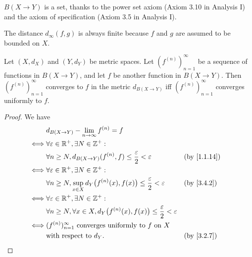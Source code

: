 \begin{note}
  \(B(X \to Y)\) is a set, thanks to the power set axiom (Axiom 3.10 in Analysis I) and the axiom of specification (Axiom 3.5 in Analysis I).
\end{note}

\begin{note}
  The distance \(d_\infty(f, g)\) is always finite because \(f\) and \(g\) are assumed to be bounded on \(X\).
\end{note}

\setcounter{thm}{3}
\begin{prop}\label{3.4.4}
  Let \((X, d_X)\) and \((Y, d_Y)\) be metric spaces.
  Let \((f^{(n)})_{n = 1}^\infty\) be a sequence of functions in \(B(X \to Y)\), and let \(f\) be another function in \(B(X \to Y)\).
  Then \((f^{(n)})_{n = 1}^\infty\) converges to \(f\) in the metric \(d_{B(X \to Y)}\) iff \((f^{(n)})_{n = 1}^\infty\) converges uniformly to \(f\).
\end{prop}

\begin{proof}
  We have
  \begin{align*}
         & d_{B(X \to Y)} - \lim_{n \to \infty} f^{(n)} = f                                                                            \\
    \iff & \forall \varepsilon \in \R^+, \exists N \in \Z^+ :                                                                          \\
         & \forall n \geq N, d_{B(X \to Y)}(f^{(n)}, f) \leq \dfrac{\varepsilon}{2} < \varepsilon                     &  & \by{1.1.14} \\
    \iff & \forall \varepsilon \in \R^+, \exists N \in \Z^+ :                                                                          \\
         & \forall n \geq N, \sup_{x \in X} d_Y\big(f^{(n)}(x), f(x)\big) \leq \dfrac{\varepsilon}{2} < \varepsilon   &  & \by{3.4.2}  \\
    \iff & \forall \varepsilon \in \R^+, \exists N \in \Z^+ :                                                                          \\
         & \forall n \geq N, \forall x \in X, d_Y\big(f^{(n)}(x), f(x)\big) \leq \dfrac{\varepsilon}{2} < \varepsilon                  \\
    \iff & (f^{(n)})_{n = 1}^\infty \text{ converges uniformly to } f \text{ on } X                                                    \\
         & \text{with respect to } d_Y.                                                                               &  & \by{3.2.7}
  \end{align*}
\end{proof}

